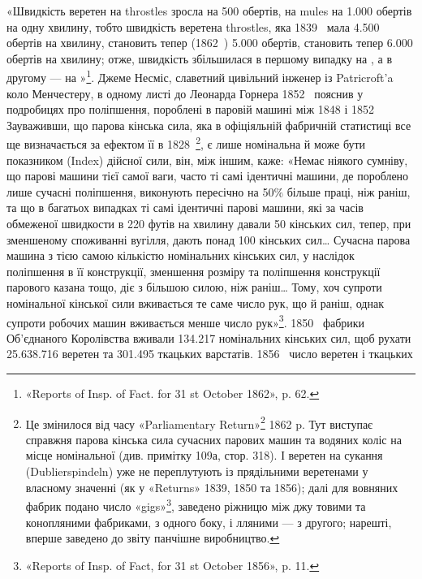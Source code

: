 «Швидкість веретен на throstles зросла на 500 обертів, на
mules на \num{1.000} обертів на одну хвилину, тобто швидкість веретена
throstles, яка 1839~ мала \num{4.500} обертів на хвилину, становить
тепер (1862~) \num{5.000} обертів, становить тепер \num{6.000} обертів на хвилину; отже,
швидкість збільшилася в першому випадку на , а в другому —
на »\footnote{
«Reports of Insp. of Fact. for 31 st October 1862», p. 62.
}. Джеме Несміс, славетний цивільний інженер із
Patricroft’a коло Менчестеру, в одному листі до Леонарда Горнера
1852~ пояснив у подробицях про поліпшення, пороблені в паровій
машині між 1848 і 1852~ Зауваживши, що парова кінська
сила, яка в офіціяльній фабричній статистиці все ще визначається
за ефектом її в 1828~\footnote{
Це змінилося від часу «Parliamentary Return»\footnote*{
— парляментського звіту. \emph{Ред.}
} 1862 p. Тут виступає справжня парова кінська сила сучасних парових машин
та водяних коліс на місце номінальної (див. примітку 109а, стор. 318). І веретен
на сукання (Dublierspindeln) уже не переплутують із прядільними веретенами
у власному значенні (як у «Returns» 1839, 1850 та 1856); далі
для вовняних фабрик подано число «gigs»\footnote*{
— ворсувальних машин. \emph{Ред.}
}, заведено ріжницю між джу
товими та конопляними фабриками, з одного боку, і лляними — з другого;
нарешті, вперше заведено до звіту панчішне виробництво.
}, є лише номінальна й може бути
показником (Index) дійсної сили, він, між іншим, каже:
«Немає ніякого сумніву, що парові машини тієї самої ваги, часто
ті самі ідентичні машини, де пороблено лише сучасні поліпшення,
виконують пересічно на 50\% більше праці, ніж раніш, та що в
багатьох випадках ті самі ідентичні парові машини, які за часів
обмеженої швидкости в 220 футів на хвилину давали 50 кінських
сил, тепер, при зменшеному споживанні вугілля, дають понад 100
кінських сил\dots{} Сучасна парова машина з тією самою кількістю
номінальних кінських сил, у наслідок поліпшення в її конструкції,
зменшення розміру та поліпшення конструкції парового
казана тощо, діє з більшою силою, ніж раніш\dots{} Тому, хоч супроти
номінальної кінської сили вживається те саме число рук, що й
раніш, однак супроти робочих машин вживається менше число
рук»\footnote{
«Reports of Insp. of Fact, for 31 st October 1856», p. 11.
}. 1850~ фабрики Об’єднаного Королівства вживали \num{134.217}
номінальних кінських сил, щоб рухати \num{25.638.716} веретен та
\num{301.495} ткацьких варстатів. 1856~ число веретен і ткацьких
